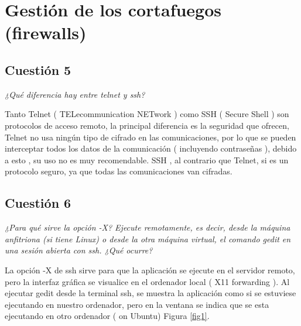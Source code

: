 \section{Gestión de los cortafuegos (firewalls)}
\subsection{Cuestión 5}
\textit{¿Qué diferencia hay entre telnet y ssh?}
\newline

Tanto Telnet ( TELecommunication NETwork ) como SSH ( Secure Shell ) son protocolos de acceso remoto, la principal diferencia es la seguridad que ofrecen, Telnet no usa ningún tipo de cifrado en las comunicaciones, por lo que se pueden interceptar todos los datos de la comunicación ( incluyendo contraseñas ), debido a esto , su uso no es muy recomendable. SSH , al contrario que Telnet, si es un protocolo seguro, ya que todas las comunicaciones van cifradas. \cite{sshtle}





\subsection{Cuestión 6}
\textit{¿Para qué sirve la opción -X? Ejecute remotamente, es decir, desde la máquina anfitriona (si tiene Linux) o desde la otra máquina virtual, el comando gedit en una sesión abierta con ssh. ¿Qué ocurre?}
\newline

La opción -X de ssh sirve para que la aplicación se ejecute en el servidor remoto, pero la interfaz gráfica se visualice en el ordenador local ( X11 forwarding ). \cite{sshx} Al ejecutar gedit desde la terminal ssh, se muestra la aplicación como si se estuviese ejecutando en nuestro ordenador, pero en la ventana se indica que se esta ejecutando en otro ordenador ( on Ubuntu) Figura \ref{fig1}. 

